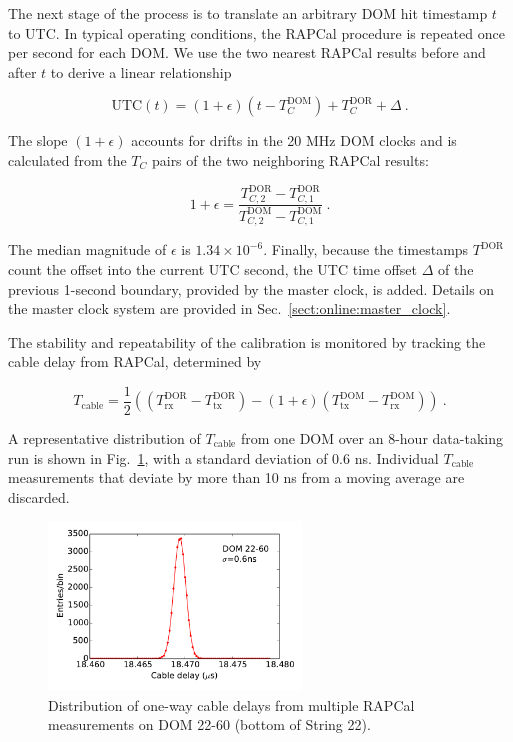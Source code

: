 The next stage of the process is to translate an arbitrary DOM hit timestamp
$t$ to UTC.  In typical operating conditions, the RAPCal procedure
is repeated once per second for each DOM.  We use the two nearest RAPCal
results before and after $t$ to derive a linear relationship

\begin{equation}
  \mathrm{UTC}(t) = (1+\epsilon)(t - T_C^{\mathrm{DOM}}) +
  T_C^{\mathrm{DOR}} + \Delta\ .
\end{equation}

\noindent The slope $(1+\epsilon)$ accounts for drifts in the 20 MHz DOM
clocks and is calculated from the $T_C$ pairs of the two neighboring RAPCal
results: 

\begin{equation}
  1+\epsilon = \frac{T_{C,2}^{\mathrm{DOR}} -
    T_{C,1}^{\mathrm{DOR}}}{T_{C,2}^{\mathrm{DOM}} -
    T_{C,1}^{\mathrm{DOM}}}\ .
\end{equation}

\noindent The median magnitude of $\epsilon$ is $1.34 \times 10^{-6}$.
Finally, because the timestamps $T^{\mathrm{DOR}}$ count the offset into 
the current UTC second, the UTC time offset $\Delta$ of the previous
1-second boundary, provided by the master clock, is added.  Details on the
master clock system are provided in Sec.~\ref{sect:online:master_clock}.

The stability and repeatability of the calibration is monitored by
tracking the cable delay from RAPCal, determined by

\begin{equation}
  T_{\mathrm{cable}} = \frac{1}{2} \left( ( T_{\mathrm{rx}}^{\mathrm{DOR}} -
  T_{\mathrm{tx}}^{\mathrm{DOR}} ) - (1+\epsilon)(T_{\mathrm{tx}}^{\mathrm{DOM}} -
  T_{\mathrm{rx}}^{\mathrm{DOM}} )\right) \ .
\end{equation}

\noindent A representative distribution of $T_{\mathrm{cable}}$ from one DOM over an 8-hour
data-taking run is shown in Fig.~\ref{fig:rapcal_cable_len}, with a
standard deviation of 0.6 ns.  Individual $T_{\mathrm{cable}}$
measurements that deviate by more than 10 ns from a moving average are discarded.

\begin{figure}[!h]
 \centering
 \includegraphics[width=0.6\textwidth]{graphics/dom/rapcal/tcal_hist_22-60.pdf}
 \caption{Distribution of one-way cable delays from multiple RAPCal
   measurements on DOM 22-60 (bottom of String 22).}
 \label{fig:rapcal_cable_len}
\end{figure}

